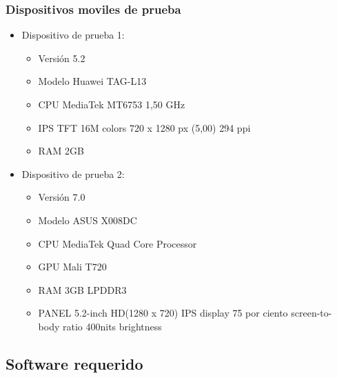 	 	\subsubsection{Dispositivos moviles de prueba}
	 		\begin{itemize}   		
				\item Dispositivo de prueba 1:
			   		\begin{itemize}
			   			\item Versión 5.2
			   			\item Modelo Huawei TAG-L13
			   			\item CPU MediaTek MT6753 1,50 GHz
			   			\item IPS TFT 16M colors 720 x 1280 px (5,00) 294 ppi
			   			\item RAM 2GB	   			
			   		\end{itemize}
	   		
	   			\item Dispositivo de prueba 2:
			   		\begin{itemize}
			   			\item Versión 7.0
			   			\item Modelo ASUS X008DC
			   			\item CPU MediaTek Quad Core Processor
			   			\item GPU Mali T720
			   			\item RAM 3GB LPDDR3
			   			\item PANEL 5.2-inch
			   			HD(1280 x 720) IPS display 
			   			75 por ciento screen-to-body ratio
			   			400nits brightness 
			   		\end{itemize}   		  		
	   		\end{itemize}
	
	
	\subsection{Software requerido}
